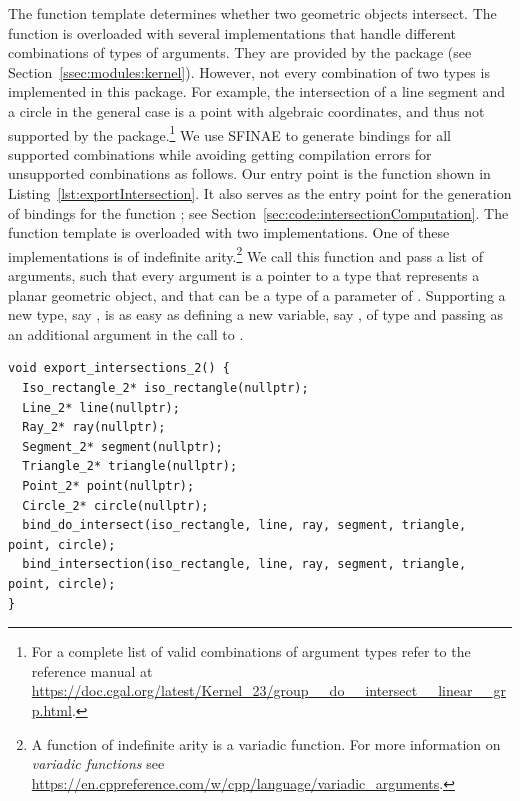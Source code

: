 The function template 
determines whether two geometric objects intersect. The function
is overloaded with several implementations that handle different 
combinations of types of arguments. They are provided by the 
\iiDandiiiDGeometryKernelPackage{} package (see
Section~\ref{ssec:modules:kernel}). However, not every combination
of two types is implemented in this package. For example, the 
intersection of a line segment and a circle in the general case is a 
point with algebraic coordinates, and thus not supported by the 
package.\footnote{For a complete list of valid combinations of 
 argument types refer to the reference 
manual at
  \url{https://doc.cgal.org/latest/Kernel_23/group__do__intersect__linear__grp.html}.}
We use SFINAE to generate bindings for all supported combinations
while avoiding getting compilation errors for unsupported combinations
as follows. 
%
Our entry point is the function 
shown in Listing~\ref{lst:exportIntersection}. It also serves as the
entry point for the generation of bindings for the function
; see
Section~\ref{sec:code:intersectionComputation}. The function template
 is overloaded with two 
implementations. One of these implementations is of indefinite 
arity.\footnote{A function of indefinite arity is a variadic function. 
For more information on \emph{variadic functions} see
  \url{https://en.cppreference.com/w/cpp/language/variadic_arguments}.}
We call this function and pass a list of arguments, such that every 
argument is a pointer to a type that represents a planar geometric object,
and that can be a type of a parameter of 
. Supporting a new type, say 
, is as easy as defining a new variable, say 
, of type  and passing 
 as an additional argument in the call to .

\begin{lstfloat}
  \begin{lstlisting}[style=cppFramedStyle,basicstyle=\normalsize,%
                     label={lst:exportIntersection},%
                     caption={Entry points for the code that automatically generates
                     binding for \cppLstinline{CGAL::do_intersect()} and
                     \cppLstinline{CGAL::intersection()} with arguments 
                     that represent planar geometric objects.}]
void export_intersections_2() {
  Iso_rectangle_2* iso_rectangle(nullptr);
  Line_2* line(nullptr);
  Ray_2* ray(nullptr);
  Segment_2* segment(nullptr);
  Triangle_2* triangle(nullptr);
  Point_2* point(nullptr);
  Circle_2* circle(nullptr);
  bind_do_intersect(iso_rectangle, line, ray, segment, triangle, point, circle);
  bind_intersection(iso_rectangle, line, ray, segment, triangle, point, circle);
}
  \end{lstlisting}
\end{lstfloat}

